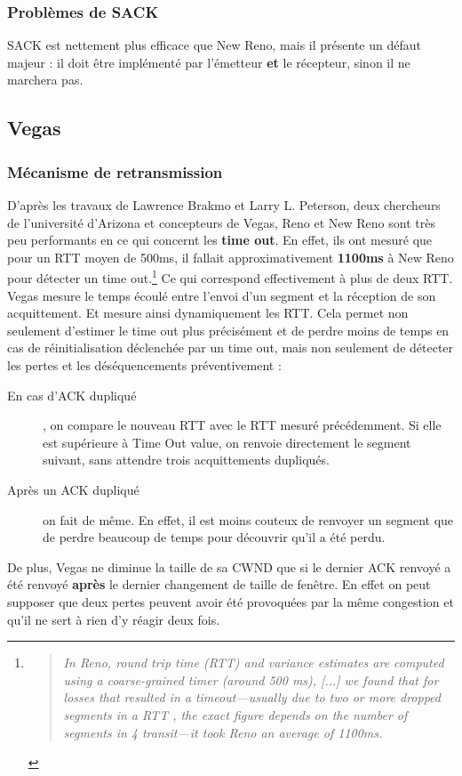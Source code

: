\documentclass[	DIV=calc,%
							paper=a4,%
							fontsize=11pt,%
							twocolumn]{scrartcl}	 					%
\begin{document}
\subsubsection*{Problèmes de SACK}
SACK est nettement plus efficace que New Reno, mais il présente un défaut majeur : il doit être implémenté par l'émetteur \textbf{et} le récepteur, sinon il ne marchera pas.
\subsection*{Vegas}
\subsubsection*{Mécanisme de retransmission}
D'après les travaux de Lawrence Brakmo et Larry L. Peterson, deux chercheurs de l'université d'Arizona et concepteurs de Vegas, Reno et New Reno sont très peu performants en ce qui concernt les \textbf{time out}. En effet, ils ont mesuré que pour un RTT moyen de 500ms, il fallait approximativement \textbf{1100ms} à New Reno pour détecter un time out.\footnote{\begin{quote}\textit{In Reno, round trip time (RTT) and variance estimates are computed using a coarse-grained timer (around 500 ms), [...] we found that for losses that resulted in a timeout—usually due to two or more dropped segments in a RTT , the exact figure depends on the number of segments in 4 transit—it took Reno an average of 1100ms.}\end{quote}} Ce qui correspond effectivement à plus de deux RTT. Vegas mesure le temps écoulé entre l'envoi d'un segment et la réception de son acquittement. Et mesure ainsi dynamiquement les RTT.
Cela permet non seulement d'estimer le time out plus précisément et de perdre moins de temps en cas de réinitialisation déclenchée par un time out, mais non seulement de détecter les pertes et les déséquencements préventivement :
\begin{description}
	\item[En cas d'ACK dupliqué]{, on compare le nouveau RTT avec le RTT mesuré précédemment. Si elle est supérieure à Time Out value, on renvoie directement le segment suivant, sans attendre trois acquittements dupliqués.}
	\item[Après un ACK dupliqué]{on fait de même. En effet, il est moins couteux de renvoyer un segment que de perdre beaucoup de temps pour découvrir qu'il a été perdu. }
\end{description}
De plus, Vegas ne diminue la taille de sa CWND que si le dernier ACK renvoyé a été renvoyé \textbf{après} le dernier changement de taille de fenêtre. En effet on peut supposer que deux pertes peuvent avoir été provoquées par la même congestion et qu'il ne sert à rien d'y réagir deux fois.
\end{document}
